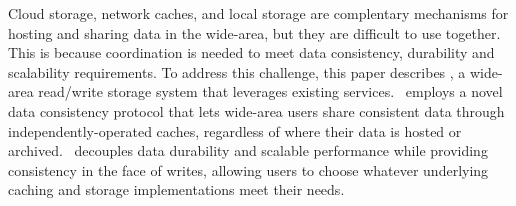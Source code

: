  Cloud storage, network caches, and local
storage are complentary mechanisms for hosting and sharing data in the
wide-area, but they are difficult to use together. This is because
coordination is needed to meet data consistency, durability and
scalability requirements. To address this challenge, this paper
describes \Syndicate, a wide-area read/write storage system that
leverages existing services. \Syndicate\ employs a novel data
consistency protocol that lets wide-area users share consistent data
through independently-operated caches, regardless of where their data
is hosted or archived. \Syndicate\ decouples data durability and
scalable performance while providing consistency in the face of
writes, allowing users to choose whatever underlying caching and
storage implementations meet their needs.

